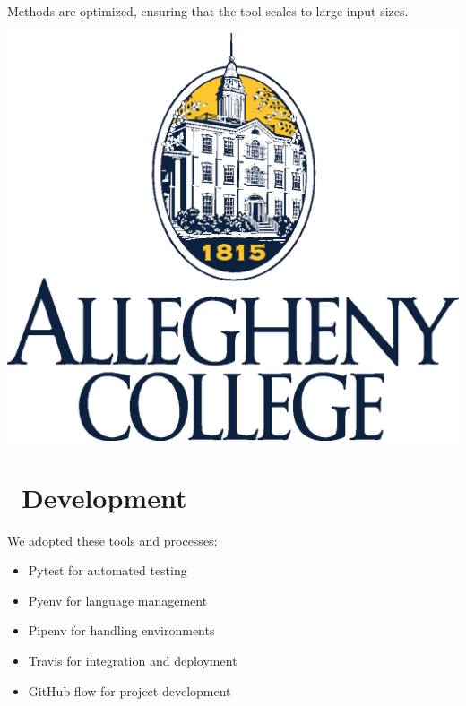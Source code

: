 \documentclass[a0paper,fleqn]{betterposter}
\begin{document}
{  \vspace*{.25in}
  Methods are optimized, ensuring that the tool scales to large input sizes.
  \vspace*{.5in}

  \vfill

  \includegraphics[width=\textwidth]{img/CollegeLogo.eps}\\

  }{


  \vspace*{-.5in}
  \section{\faCodeFork~Development}
  We adopted these tools and processes:\\
  \vspace*{-.5in}
  \begin{itemize}[leftmargin=*]

    \item{Pytest for automated testing}
    \item{Pyenv for language management}
    \item{Pipenv for handling environments}
    \item{Travis for integration and deployment}
    \item{GitHub flow for project development}


\end{itemize}}
\end{document}

